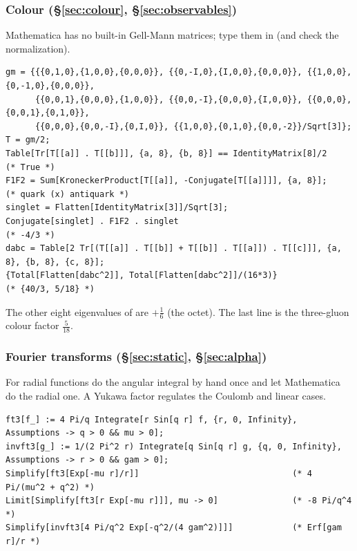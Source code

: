 \documentclass[11pt,a4paper]{article}
\numberwithin{equation}{section}
\theoremstyle{definition}
\theoremstyle{plain}
\theoremstyle{remark}
\numberwithin{algorithm}{section}
\begin{document}
\subsubsection{Colour (\S\ref{sec:colour}, \S\ref{sec:observables})}
Mathematica has no built-in Gell-Mann matrices; type them in (and check the normalization).
\begin{lstlisting}[style=wl]
gm = {{{0,1,0},{1,0,0},{0,0,0}}, {{0,-I,0},{I,0,0},{0,0,0}}, {{1,0,0},{0,-1,0},{0,0,0}},
      {{0,0,1},{0,0,0},{1,0,0}}, {{0,0,-I},{0,0,0},{I,0,0}}, {{0,0,0},{0,0,1},{0,1,0}},
      {{0,0,0},{0,0,-I},{0,I,0}}, {{1,0,0},{0,1,0},{0,0,-2}}/Sqrt[3]};
T = gm/2;
Table[Tr[T[[a]] . T[[b]]], {a, 8}, {b, 8}] == IdentityMatrix[8]/2      (* True *)
F1F2 = Sum[KroneckerProduct[T[[a]], -Conjugate[T[[a]]]], {a, 8}];     (* quark (x) antiquark *)
singlet = Flatten[IdentityMatrix[3]]/Sqrt[3];
Conjugate[singlet] . F1F2 . singlet                                   (* -4/3 *)
dabc = Table[2 Tr[(T[[a]] . T[[b]] + T[[b]] . T[[a]]) . T[[c]]], {a, 8}, {b, 8}, {c, 8}];
{Total[Flatten[dabc^2]], Total[Flatten[dabc^2]]/(16*3)}                 (* {40/3, 5/18} *)
\end{lstlisting}
The other eight eigenvalues of  are $+\frac16$ (the octet). The last line is the three-gluon colour factor $\frac{5}{18}$.

\subsubsection{Fourier transforms (\S\ref{sec:static}, \S\ref{sec:alpha})}
For radial functions do the angular integral by hand once and let Mathematica do the radial one. A Yukawa factor regulates the Coulomb and linear cases.
\begin{lstlisting}[style=wl]
ft3[f_] := 4 Pi/q Integrate[r Sin[q r] f, {r, 0, Infinity}, Assumptions -> q > 0 && mu > 0];
invft3[g_] := 1/(2 Pi^2 r) Integrate[q Sin[q r] g, {q, 0, Infinity}, Assumptions -> r > 0 && gam > 0];
Simplify[ft3[Exp[-mu r]/r]]                               (* 4 Pi/(mu^2 + q^2) *)
Limit[Simplify[ft3[r Exp[-mu r]]], mu -> 0]               (* -8 Pi/q^4 *)
Simplify[invft3[4 Pi/q^2 Exp[-q^2/(4 gam^2)]]]            (* Erf[gam r]/r *)
\end{lstlisting}
\end{document}
